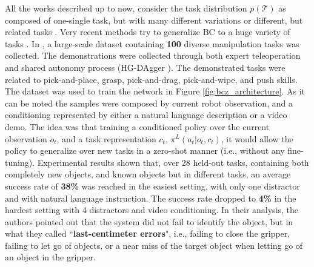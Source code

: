 All the works described up to now, consider the task distribution $p(\mathcal{T})$ as composed of one-single task, but with many different variations \cite{finn2017one_shot_visual_il} or different, but related tasks \cite{yu2018daml}. Very recent methods try to generalize BC to a huge variety of tasks \cite{jang2022bc_z,mandi2022towards_more_generalizable_one_shot}.
In \cite{jang2022bc_z}, a large-scale dataset containing \textbf{100} diverse manipulation tasks was collected. The demonstrations were collected through both expert teleoperation and shared autonomy process (HG-DAgger \cite{kelly2019hg_dagger}). The demonstrated tasks were related to pick-and-place, grasp, pick-and-drag, pick-and-wipe, and push skills. The dataset was used to train the network in Figure \ref{fig:bcz_architecture}. As it can be noted the samples were composed by current robot observation, and a conditioning represented by either a natural language description or a video demo. The idea was that training a conditioned policy over the current observation $o_{t}$, and a task representation $c_{t}$, $\pi^{L}(a_{t}|o_{t}, c_{t})$, it would allow the policy to generalize over new tasks in a zero-shot manner (i.e., without any fine-tuning). Experimental results shown that, over 28 held-out tasks, containing both completely new objects, and known objects but in different tasks, an average success rate of \textbf{38\%} was reached in the easiest setting, with only one distractor and with natural language instruction. The success rate dropped to \textbf{4\%} in the hardest setting with 4 distractors and video conditioning. %
In their analysis, the authors pointed out that the system did not fail to identify the object, but in what they called ``\textbf{last-centimeter errors}", i.e., failing to close the gripper, failing to let go of objects, or a near miss of the target object when letting go of an object in the gripper. 
